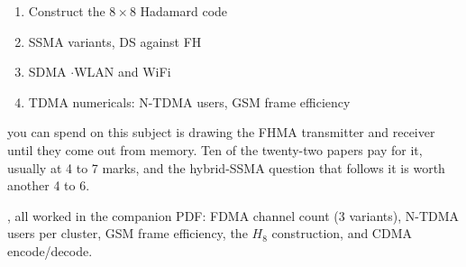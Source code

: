 {\begin{enumerate}
  \item Construct the $8\times8$ Hadamard code 
  \item SSMA variants, DS against FH 
  \item SDMA  \gap$\cdot$\gap WLAN and WiFi 
  \item TDMA numericals: N-TDMA users, GSM frame efficiency 
\end{enumerate}
\vspace{2pt}
{\color{sub}\footnotesize {} you can spend on this subject is
drawing the FHMA transmitter and receiver until they come out from memory. Ten of the
twenty-two papers pay for it, usually at 4 to 7 marks, and the hybrid-SSMA question that
follows it is worth another 4 to 6.}

\vspace{2pt}
{\color{sub}\footnotesize {}, all worked in the companion PDF:
FDMA channel count (3 variants), N-TDMA users per cluster, GSM frame efficiency, the $H_8$
construction, and CDMA encode/decode.}}
